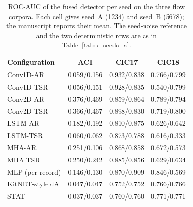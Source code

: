 \begin{table}[ht]\centering\scriptsize\setlength{\tabcolsep}{3pt}
\begin{tabular}{lccc}
\hline
\textbf{Configuration} & \textbf{ACI} & \textbf{CIC17} & \textbf{CIC18}\\
\hline
Conv1D-AR & 0.059/0.156 & 0.932/0.838 & 0.766/0.799\\
Conv1D-TSR & 0.056/0.151 & 0.928/0.835 & 0.540/0.799\\
Conv2D-AR & 0.376/0.469 & 0.859/0.864 & 0.789/0.794\\
Conv2D-TSR & 0.366/0.467 & 0.898/0.830 & 0.719/0.800\\
LSTM-AR & 0.182/0.192 & 0.810/0.875 & 0.626/0.642\\
LSTM-TSR & 0.060/0.062 & 0.873/0.788 & 0.616/0.333\\
MHA-AR & 0.251/0.106 & 0.868/0.858 & 0.672/0.573\\
MHA-TSR & 0.250/0.242 & 0.885/0.856 & 0.629/0.634\\
MLP (per record) & 0.146/0.130 & 0.870/0.909 & 0.846/0.569\\
KitNET-style dA & 0.047/0.047 & 0.752/0.752 & 0.766/0.766\\
STAT & 0.037/0.037 & 0.760/0.760 & 0.771/0.771\\
\hline
\end{tabular}
\caption{ROC-AUC of the fused detector per seed on the three flow corpora. Each cell gives seed~A (1234) and seed~B (5678); the manuscript reports their mean. The seed-noise reference and the two deterministic rows are as in Table~\ref{tab:s_seeds_a}.}\label{tab:s_seeds_b}
\end{table}

